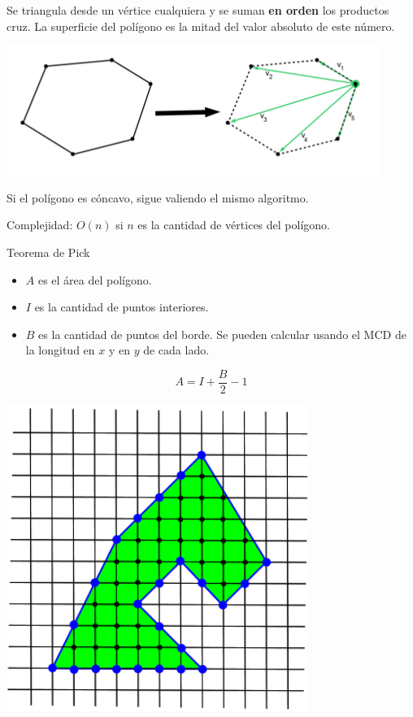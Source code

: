 \documentclass[compress]{beamer}
\newcommand{\bigpause}{\bigskip \pause}
\begin{document}
\begin{frame}

Se triangula desde un v\'ertice cualquiera y se suman \textbf{en orden} los productos cruz. La superficie del pol\'igono es la mitad del valor absoluto de este n\'umero.

\begin{center}
\includegraphics[scale=0.6]{images/triangulacion.png}
\end{center}

Si el pol\'igono es c\'oncavo, sigue valiendo el mismo algoritmo.
\bigpause

Complejidad: $O(n)$ si $n$ es la cantidad de v\'ertices del pol\'igono.

\end{frame}

\begin{frame}{Teorema de Pick}

{\footnotesize
\begin{itemize}
\item $A$ es el \'area del pol\'igono.
\item $I$ es la cantidad de puntos interiores.
\item $B$ es la cantidad de puntos del borde. Se pueden calcular usando
el MCD de la longitud en $x$ y en $y$ de cada lado.
\end{itemize}

$$ A = I + \displaystyle \frac{B}{2} -1 $$}

\begin{center}
\includegraphics[scale=0.3]{images/pick.png}
\end{center}

\end{frame}
\end{document}
